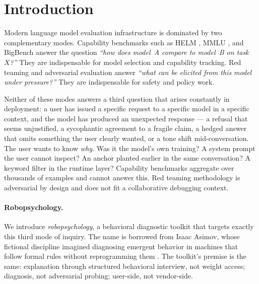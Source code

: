 \section{Introduction}
\label{sec:introduction}

Modern language model evaluation infrastructure is dominated by two
complementary modes. Capability benchmarks such as HELM
\citep{liang2022holistic}, MMLU \citep{hendrycks2020measuring},
and BigBench \citep{srivastava2022beyond} answer the question
\emph{``how does model~A compare to model~B on task~$X$?''} They are
indispensable for model selection and capability tracking. Red teaming
and adversarial evaluation \citep{perez2022red, ganguli2022red} answer
\emph{``what can be elicited from this model under pressure?''} They are
indispensable for safety and policy work.

Neither of these modes answers a third question that arises constantly
in deployment: a user has issued a specific request to a specific model
in a specific context, and the model has produced an unexpected
response --- a refusal that seems unjustified, a sycophantic agreement
to a fragile claim, a hedged answer that omits something the user
clearly wanted, or a tone shift mid-conversation. The user wants to
know \emph{why}. Was it the model's own training? A system prompt the
user cannot inspect? An anchor planted earlier in the same
conversation? A keyword filter in the runtime layer? Capability
benchmarks aggregate over thousands of examples and cannot answer this.
Red teaming methodology is adversarial by design and does not fit a
collaborative debugging context.

\paragraph{Robopsychology.}
We introduce \emph{robopsychology}, a behavioral diagnostic toolkit
that targets exactly this third mode of inquiry. The name is borrowed
from Isaac Asimov, whose fictional discipline imagined diagnosing
emergent behavior in machines that follow formal rules without
reprogramming them \citep{asimov1950}. The toolkit's premise is the
same: explanation through structured behavioral interview, not weight
access; diagnosis, not adversarial probing; user-side, not vendor-side.

